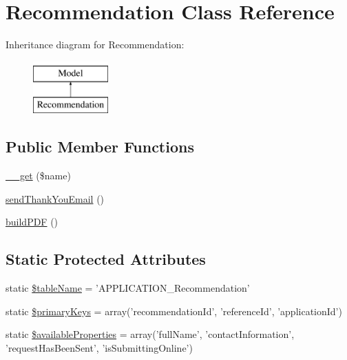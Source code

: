 \hypertarget{class_recommendation}{\section{Recommendation Class Reference}
\label{class_recommendation}
}
Inheritance diagram for Recommendation\-:\begin{figure}[H]
\begin{center}
\leavevmode
\includegraphics[height=2.000000cm]{class_recommendation}
\end{center}
\end{figure}
\subsection*{Public Member Functions}
\begin{DoxyCompactItemize}
\item 
\hyperlink{class_recommendation_a0f72c27a53bade868800eb2e0ef141e3}{\-\_\-\-\_\-get} (\$name)
\item 
\hyperlink{class_recommendation_afdd79eceab015553601b0f1332f27b8e}{send\-Thank\-You\-Email} ()
\item 
\hyperlink{class_recommendation_ab262bb9e1d4c0a2988ed72311b336703}{build\-P\-D\-F} ()
\end{DoxyCompactItemize}
\subsection*{Static Protected Attributes}
\begin{DoxyCompactItemize}
\item 
static \hyperlink{class_recommendation_a705e36a14ddbea850539707ea9127502}{\$table\-Name} = 'A\-P\-P\-L\-I\-C\-A\-T\-I\-O\-N\-\_\-\-Recommendation'
\item 
static \hyperlink{class_recommendation_a4462f986c2d517384670c0d04b8e2774}{\$primary\-Keys} = array('recommendation\-Id', 'reference\-Id', 'application\-Id')
\item 
static \hyperlink{class_recommendation_aaa95b2ecd9864a9fd1c947765b657189}{\$available\-Properties} = array('full\-Name', 'contact\-Information', 'request\-Has\-Been\-Sent', 'is\-Submitting\-Online')
\end{DoxyCompactItemize}
